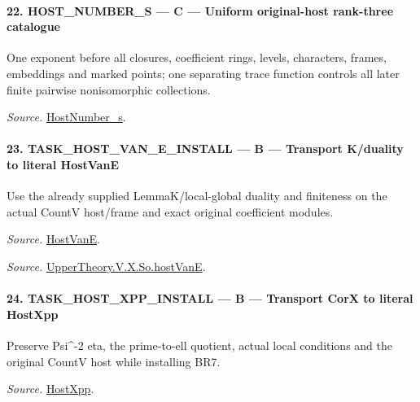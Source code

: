 \paragraph{22. HOST\_\allowbreak NUMBER\_\allowbreak S — C — Uniform original-host rank-three catalogue}

One exponent before all closures, coefficient rings, levels, characters, frames, embeddings and marked points; one separating trace function controls all later finite pairwise nonisomorphic collections.

\emph{Source.} \href{https://github.com/CocoSgt/riemann-hypothesis-lean/blob/7cbf7a0c32fca1badf05931879a37c3f8a2b03b4/src/Development/AutomorphicArithmetic/AutomorphicVarieties/ModularityArgument/ThresholdArguments/DenseThresholdCases/HostNumberS.lean#L18-L28}{HostNumber\_\allowbreak s}.



\paragraph{23. TASK\_\allowbreak HOST\_\allowbreak VAN\_\allowbreak E\_\allowbreak INSTALL — B — Transport K/duality to literal HostVanE}

Use the already supplied LemmaK/local-global duality and finiteness on the actual CountV host/frame and exact original coefficient modules.

\emph{Source.} \href{https://github.com/CocoSgt/riemann-hypothesis-lean/blob/7cbf7a0c32fca1badf05931879a37c3f8a2b03b4/src/Development/AutomorphicArithmetic/AutomorphicVarieties/UnitaryThreeDeformations/HostNumber.lean#L9-L12}{HostVanE}.

\emph{Source.} \href{https://github.com/CocoSgt/riemann-hypothesis-lean/blob/7cbf7a0c32fca1badf05931879a37c3f8a2b03b4/src/Development/AutomorphicArithmetic/AutomorphicVarieties/LevelCohomology/SoHostVanE.lean#L11-L18}{UpperTheory.V.X.So.hostVanE}.



\paragraph{24. TASK\_\allowbreak HOST\_\allowbreak XPP\_\allowbreak INSTALL — B — Transport CorX to literal HostXpp}

Preserve Psi\textasciicircum{}-2 eta, the prime-to-ell quotient, actual local conditions and the original CountV host while installing BR7.

\emph{Source.} \href{https://github.com/CocoSgt/riemann-hypothesis-lean/blob/7cbf7a0c32fca1badf05931879a37c3f8a2b03b4/src/Development/AutomorphicArithmetic/AutomorphicVarieties/UnitaryThreeDeformations/HostNumber.lean#L14-L17}{HostXpp}.

